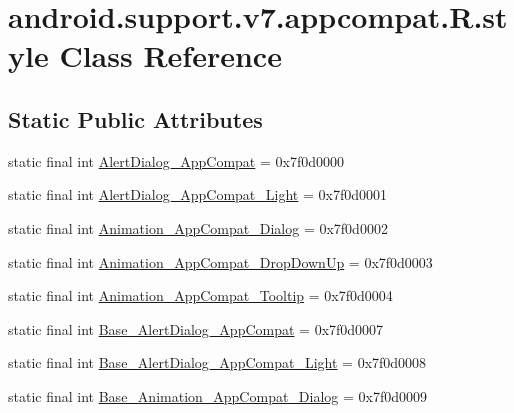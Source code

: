 \hypertarget{classandroid_1_1support_1_1v7_1_1appcompat_1_1_r_1_1style}{}\section{android.\+support.\+v7.\+appcompat.\+R.\+style Class Reference}
\label{classandroid_1_1support_1_1v7_1_1appcompat_1_1_r_1_1style}
\subsection*{Static Public Attributes}
\begin{DoxyCompactItemize}
\item 
static final int \mbox{\hyperlink{classandroid_1_1support_1_1v7_1_1appcompat_1_1_r_1_1style_a7a80ce426bb2017e2b8138a6b04a04c8}{Alert\+Dialog\+\_\+\+App\+Compat}} = 0x7f0d0000
\item 
static final int \mbox{\hyperlink{classandroid_1_1support_1_1v7_1_1appcompat_1_1_r_1_1style_a5286b0af3aae6595cd012386e576a340}{Alert\+Dialog\+\_\+\+App\+Compat\+\_\+\+Light}} = 0x7f0d0001
\item 
static final int \mbox{\hyperlink{classandroid_1_1support_1_1v7_1_1appcompat_1_1_r_1_1style_adaf79da50296b63434dd1dd8d3b1e0da}{Animation\+\_\+\+App\+Compat\+\_\+\+Dialog}} = 0x7f0d0002
\item 
static final int \mbox{\hyperlink{classandroid_1_1support_1_1v7_1_1appcompat_1_1_r_1_1style_a6a35f583f9c5a6779203c4ab3bb33fe6}{Animation\+\_\+\+App\+Compat\+\_\+\+Drop\+Down\+Up}} = 0x7f0d0003
\item 
static final int \mbox{\hyperlink{classandroid_1_1support_1_1v7_1_1appcompat_1_1_r_1_1style_a674edc46bb999f146c7392998060e2ab}{Animation\+\_\+\+App\+Compat\+\_\+\+Tooltip}} = 0x7f0d0004
\item 
static final int \mbox{\hyperlink{classandroid_1_1support_1_1v7_1_1appcompat_1_1_r_1_1style_a057db4a6871979d848f88b8529f1d73f}{Base\+\_\+\+Alert\+Dialog\+\_\+\+App\+Compat}} = 0x7f0d0007
\item 
static final int \mbox{\hyperlink{classandroid_1_1support_1_1v7_1_1appcompat_1_1_r_1_1style_aaa202e250d48237fff9225fa646ff72a}{Base\+\_\+\+Alert\+Dialog\+\_\+\+App\+Compat\+\_\+\+Light}} = 0x7f0d0008
\item 
static final int \mbox{\hyperlink{classandroid_1_1support_1_1v7_1_1appcompat_1_1_r_1_1style_abdb58c4283f54a5857e80fedf91b8e5f}{Base\+\_\+\+Animation\+\_\+\+App\+Compat\+\_\+\+Dialog}} = 0x7f0d0009

\end{DoxyCompactItemize}
